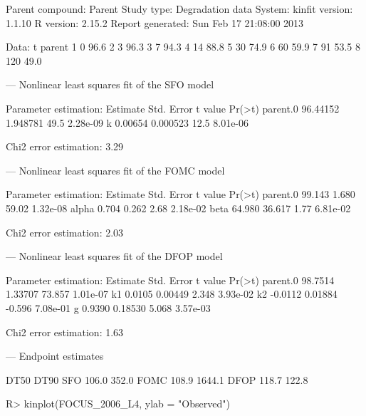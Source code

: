 \documentclass[12pt,a4paper]{article}
\begin{document}
\begin{Schunk}
\begin{Soutput}
Parent compound:  Parent 
Study type:       Degradation data 
System:            
kinfit version:   1.1.10 
R version:        2.15.2 
Report generated: Sun Feb 17 21:08:00 2013 

Data:
    t parent
1   0   96.6
2   3   96.3
3   7   94.3
4  14   88.8
5  30   74.9
6  60   59.9
7  91   53.5
8 120   49.0



---
Nonlinear least squares fit of the SFO model

Parameter estimation:	
         Estimate Std. Error t value   Pr(>t)
parent.0 96.44152   1.948781    49.5 2.28e-09
k         0.00654   0.000523    12.5 8.01e-06

Chi2 error estimation: 3.29 %



---
Nonlinear least squares fit of the FOMC model

Parameter estimation:	
         Estimate Std. Error t value   Pr(>t)
parent.0   99.143      1.680   59.02 1.32e-08
alpha       0.704      0.262    2.68 2.18e-02
beta       64.980     36.617    1.77 6.81e-02

Chi2 error estimation: 2.03 %



---
Nonlinear least squares fit of the DFOP model

Parameter estimation:	
         Estimate Std. Error t value   Pr(>t)
parent.0  98.7514    1.33707  73.857 1.01e-07
k1         0.0105    0.00449   2.348 3.93e-02
k2        -0.0112    0.01884  -0.596 7.08e-01
g          0.9390    0.18530   5.068 3.57e-03

Chi2 error estimation: 1.63 %



---
Endpoint estimates

      DT50   DT90
SFO  106.0  352.0
FOMC 108.9 1644.1
DFOP 118.7  122.8
\end{Soutput}
\begin{Sinput}
R> kinplot(FOCUS_2006_L4, ylab = "Observed")
\end{Sinput}
\end{Schunk}
\end{document}
